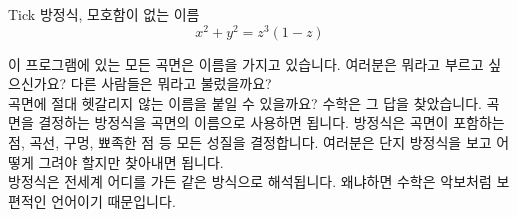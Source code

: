 ﻿\begin{surferPage}{Tick}
방정식, 모호함이 없는 이름 \\
\smallskip
\[x^2 + y^2	= z^3	(1 - z) \]


\singlespacing
이 프로그램에 있는 모든 곡면은 이름을 가지고 있습니다. 여러분은 뭐라고 부르고 싶으신가요? 다른 사람들은 뭐라고 불렀을까요?\\
\vspace{0.3cm}
곡면에 절대 헷갈리지 않는 이름을 붙일 수 있을까요? 수학은 그 답을 찾았습니다. 곡면을 결정하는 방정식을 곡면의 이름으로 사용하면 됩니다. 방정식은 곡면이 포함하는 점, 곡선, 구멍, 뾰족한 점 등 모든 성질을 결정합니다.  여러분은 단지 방정식을 보고 어떻게 그려야 할지만 찾아내면 됩니다.\\
\vspace{0.3cm}
방정식은 전세계 어디를 가든 같은 방식으로 해석됩니다. 왜냐하면 수학은 악보처럼 보편적인 언어이기 때문입니다.
\end{surferPage}
